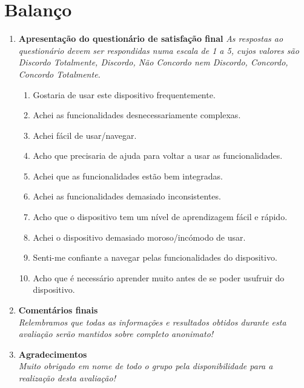 \documentclass[11pt]{article}
\begin{document}
\section*{Balanço}
    \begin{enumerate}
        \item \textbf{Apresentação do questionário de satisfação final}
            \textit{As respostas ao questionário devem ser respondidas numa escala de 1 a 5, cujos valores são Discordo Totalmente, Discordo, Não Concordo nem Discordo, Concordo, Concordo Totalmente.}
             \begin{enumerate}[label=\arabic*)]
                \item Gostaria de usar este dispositivo frequentemente.
                \item Achei as funcionalidades desnecessariamente complexas.
                \item Achei fácil de usar/navegar.
                \item Acho que precisaria de ajuda para voltar a usar as funcionalidades.
                \item Achei que as funcionalidades estão bem integradas.
                \item Achei as funcionalidades demasiado inconsistentes.
                \item Acho que o dispositivo tem um nível de aprendizagem fácil e rápido.
                \item Achei o dispositivo demasiado moroso/incómodo de usar.
                \item Senti-me confiante a navegar pelas funcionalidades do dispositivo.
                \item Acho que é necessário aprender muito antes de se poder usufruir do dispositivo.
            \end{enumerate}
        
        \item \textbf{Comentários finais}\\
        \textit{Relembramos que todas as informações e resultados obtidos durante esta avaliação serão mantidos sobre completo anonimato!}
        
        \item \textbf{Agradecimentos}\\
        \textit{Muito obrigado em nome de todo o grupo pela disponibilidade para a realização desta avaliação!}
    \end{enumerate}
\end{document}

